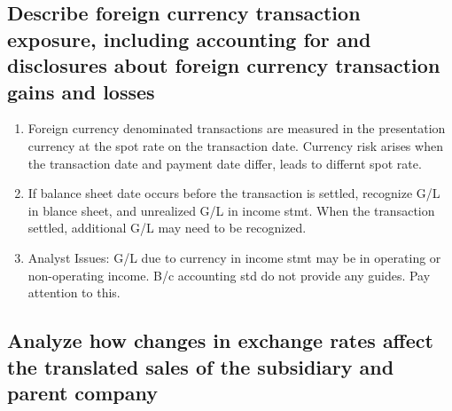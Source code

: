 \documentclass{article}
\newcommand{\be}{\begin{enumerate}}
\newcommand{\ee}{\end{enumerate}}
\begin{document}
\subsection{Describe foreign currency transaction exposure, including accounting for and 
disclosures about foreign currency transaction gains and losses}
\be
    \item Foreign currency denominated transactions are measured in the presentation
        currency at the spot rate on the transaction date. Currency risk arises when the
        transaction date and payment date differ, leads to differnt spot rate.
    \item If balance sheet date occurs before the transaction is settled, recognize G/L in
        blance sheet, and unrealized G/L in income stmt. When the transaction settled,
        additional G/L may need to be recognized.
    \item Analyst Issues: G/L due to currency in income stmt may be in operating or non-operating
        income. B/c accounting std do not provide any guides. Pay attention to this.
\ee
\subsection{Analyze how changes in exchange rates affect the translated sales of the subsidiary
and parent company}
\end{document}
